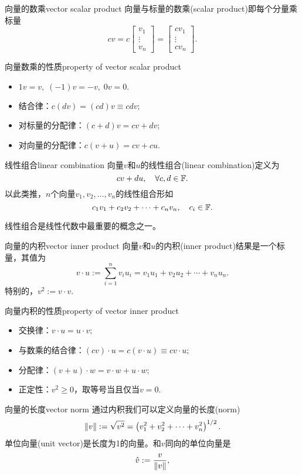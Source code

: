 \begin{definition}{向量的数乘}{vector scalar product}
	向量与标量的数乘(scalar product)即每个分量乘标量
	\[
		cv=c\begin{bmatrix}
			v_1\\\vdots\\v_n
		\end{bmatrix}=\begin{bmatrix}
			cv_1\\\vdots\\cv_n
		\end{bmatrix}.
	\]
\end{definition}
\begin{theorem}{向量数乘的性质}{property of vector scalar product}
    \begin{itemize}
    	\item $1v=v,\;(-1)v=-v,\;0v=0.$
    	\item 结合律：$c(dv)=(cd)v\equiv cdv;$
    	\item 对标量的分配律：$(c+d)v=cv+dv;$
    	\item 对向量的分配律：$c(v+u)=cv+cu.$
    \end{itemize}
\end{theorem}
\begin{definition}{线性组合}{linear combination}
	向量$v$和$u$的线性组合(linear combination)定义为
	\[
		cv+du,\quad\forall c,d\in\mathbb F.
	\]
	以此类推，$n$个向量$v_1,v_2,\ldots,v_n$的线性组合形如
	\[
		c_1v_1+c_2v_2+\cdots+c_nv_n,\quad c_i\in\mathbb F.
	\]
\end{definition}
线性组合是线性代数中最重要的概念之一。
\begin{definition}{向量的内积}{vector inner product}
	向量$v$和$u$的内积(inner product)结果是一个标量，其值为
	\begin{equation}
		v\cdot u:=\sum_{i=1}^nv_iu_i=v_1u_1+v_2u_2+\cdots+v_nu_n.
	\end{equation}
	特别的，$v^2:=v\cdot v.$
\end{definition}
\begin{theorem}{向量内积的性质}{property of vector inner product}
    \begin{itemize}
    	\item 交换律：$v\cdot u=u\cdot v;$
    	\item 与数乘的结合律：$(cv)\cdot u=c(v\cdot u)\equiv cv\cdot u;$
    	\item 分配律：$(v+u)\cdot w=v\cdot w+u\cdot w;$
    	\item 正定性：$v^2\geqslant 0$，取等号当且仅当$v=0.$
    \end{itemize}
\end{theorem}
\begin{definition}{向量的长度}{vector norm}
	通过内积我们可以定义向量的长度(norm)
	\begin{equation}
		\left\lVert v\right\rVert:=\sqrt{v^2}=\left(v_1^2+v_2^2+\cdots+v_n^2\right)^{1/2}.
	\end{equation}
	单位向量(unit vector)是长度为1的向量。和$v$同向的单位向量是
    \begin{equation}
        \hat v:=\frac{v}{\left\lVert v\right\rVert},
    \end{equation}
\end{definition}

